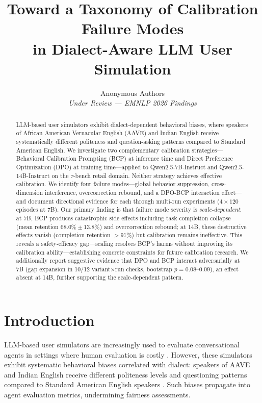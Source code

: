 \documentclass[11pt,a4paper]{article}
\title{Toward a Taxonomy of Calibration Failure Modes\\in Dialect-Aware LLM User Simulation}
\author{
  Anonymous Authors\\
  \textit{Under Review — EMNLP 2026 Findings}
}
\date{}
\begin{document}
\maketitle

\begin{abstract}
LLM-based user simulators exhibit dialect-dependent behavioral biases, where speakers of African American Vernacular English (AAVE) and Indian English receive systematically different politeness and question-asking patterns compared to Standard American English.
We investigate two complementary calibration strategies---Behavioral Calibration Prompting (BCP) at inference time and Direct Preference Optimization (DPO) at training time---applied to Qwen2.5-7B-Instruct and Qwen2.5-14B-Instruct on the $\tau$-bench retail domain.
Neither strategy achieves effective calibration.
We identify four failure modes---global behavior suppression, cross-dimension interference, overcorrection rebound, and a DPO-BCP interaction effect---and document directional evidence for each through multi-run experiments ($4 \times 120$ episodes at 7B).
Our primary finding is that failure mode severity is \emph{scale-dependent}: at 7B, BCP produces catastrophic side effects including task completion collapse (mean retention $68.0\% \pm 13.8\%$) and overcorrection rebound; at 14B, these destructive effects vanish (completion retention $>97\%$) but calibration remains ineffective.
This reveals a safety-efficacy gap---scaling resolves BCP's harms without improving its calibration ability---establishing concrete constraints for future calibration research.
We additionally report suggestive evidence that DPO and BCP interact adversarially at 7B (gap expansion in 10/12 variant$\times$run checks, bootstrap $p = 0.08$--$0.09$), an effect absent at 14B, further supporting the scale-dependent pattern.
\end{abstract}

\section{Introduction}

LLM-based user simulators are increasingly used to evaluate conversational agents in settings where human evaluation is costly \citep{yao2024taubench}. However, these simulators exhibit systematic behavioral biases correlated with dialect: speakers of AAVE and Indian English receive different politeness levels and questioning patterns compared to Standard American English speakers \citep{seshadri2026lost, sim2real2026gap}. Such biases propagate into agent evaluation metrics, undermining fairness assessments.
\end{document}
